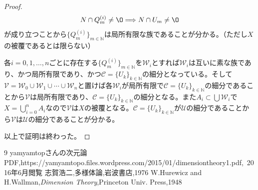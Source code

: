 \documentclass[leqno]{jsarticle}
\newcommand{\To}{\Longrightarrow}
\newcommand{\nn}{\mathbb{N}}
\newcommand{\dpst}{\displaystyle}
\begin{document}
\begin{proof}
\[
N\cap Q_m^{(i)}\neq\O\To N\cap U_m\neq\O
\]
が成り立つことから$\{Q_m^{(i)}\}_{m\in \nn}$は局所有限な族であることが分かる。（ただし$X$の被覆であるとは限らない）\par
各$i=0,1,\dots ,n$ごとに存在する$\{Q_m^{(i)}\}_{m\in \nn}$を$\mathcal{W}_{i}$とすれば$\mathcal{W}_i$は互いに素な族であり、かつ局所有限であり、かつ$\mathcal{C}=\{U_k\}_{k\in \nn}$の細分となっている。そして$\mathcal{V}=\mathcal{W}_0\cup\mathcal{W}_1\cup\cdots\cup\mathcal{W}_n$と置けば各$\mathcal{W}_i$が局所有限で$\mathcal{C}=\{U_k\}_{k\in \nn}$の細分であることから$\mathcal{V}$は局所有限であり、$\mathcal{C}=\{U_k\}_{k\in \nn}$の細分となる。また$A_i\subset \bigcup\mathcal{W}_i$で$\dpst X=\bigcup_{i=0}^nA_i$なので$\mathcal{V}$は$X$の被覆となる。$\mathcal{C}=\{U_k\}_{k\in \nn}$が$\mathcal{U}$の細分であることから$\mathcal{V}$は$\mathcal{U}$の細分であることが分かる。\par
以上で証明は終わった。
\end{proof}











































	
\begin{thebibliography}{9}
yamyamtopさんの次元論PDF,https://yamyamtopo.files.wordpress.com/2015/01/dimensiontheory1.pdf,\ 2016年6月閲覧
志賀浩二,多様体論,岩波書店,1976
W.Hurewicz and H.Wallman,\textit{Dimension Theory},Princeton Univ. Press,1948
\end{thebibliography}




			
\end{document}
